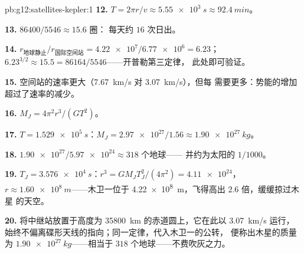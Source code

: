 \begin{solution}{pb:g12:satellites-kepler:1}
\textbf{12.} $T = 2\pi r/v \approx \qty{5.55e3}{s} \approx
\qty{92.4}{min}$。

\textbf{13.} $\num{86400}/5546 \approx 15.6$ 圈：
每天约 $16$ 次日出。

\textbf{14.} $r_{\text{地球静止}}/r_{\text{国际空间站}} = \num{4.22e7}/\num{6.77e6}
= 6.23$；$6.23^{3/2} \approx 15.5 = \num{86164}/5546$——开普勒第三定律，
此处即可验证。

\textbf{15.} 空间站的速率更大（\qty{7.67}{km/s}
对 \qty{3.07}{km/s}），但每
需要更多：势能的增加超过了速率的减少。

\textbf{16.} $M_J = 4\pi^2 r^3/(G T^2)$。

\textbf{17.} $T = \qty{1.529e5}{s}$：$M_J =
\num{2.97e27}/1.56 \approx \qty{1.90e27}{kg}$。

\textbf{18.} $\num{1.90e27}/\num{5.97e24} \approx 318$ 个地球——
并约为太阳的 $1/1000$。

\textbf{19.} $T_J = \qty{3.576e4}{s}$：$r^3 = GM_J T_J^2/(4\pi^2) =
\num{4.11e24}$，$r \approx \qty{1.60e8}{m}$——木卫一位于
\qty{4.22e8}{m}，飞得高出 $2.6$ 倍，缓缓掠过木星
的天空。

\textbf{20.} 将中继站放置于高度为
\qty{35800}{km} 的赤道圆上，它在此以 \qty{3.07}{km/s} 运行，
始终不偏离碟形天线的指向；同一定律，代入木卫一的公转，
便称出木星的质量为 $\qty{1.90e27}{kg}$——相当于 $318$ 个地球——不费吹灰之力。
\end{solution}
